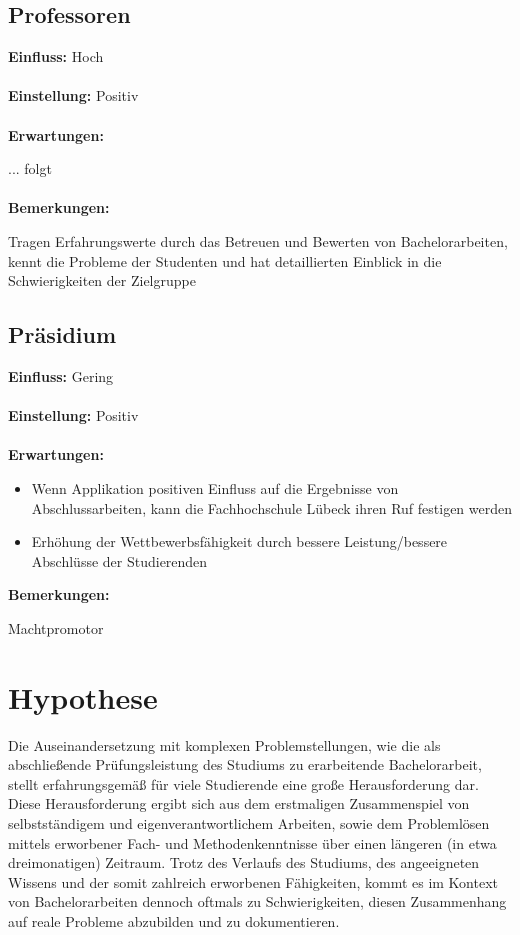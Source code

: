 \documentclass{scrreprt}
\begin{document}
\subsection{Professoren}
\textbf{Einfluss:} Hoch\\\\
\textbf{Einstellung:} Positiv\\\\
\textbf{Erwartungen:}\par ... folgt\\\\
\textbf{Bemerkungen:}\par Tragen Erfahrungswerte durch das Betreuen und Bewerten von Bachelorarbeiten, kennt die Probleme der Studenten und hat detaillierten Einblick in die Schwierigkeiten der Zielgruppe

\subsection{Präsidium}
\textbf{Einfluss:} Gering\\\\
\textbf{Einstellung:} Positiv\\\\
\textbf{Erwartungen:}
\begin{itemize}
\item Wenn Applikation positiven Einfluss auf die Ergebnisse von Abschlussarbeiten, kann die Fachhochschule Lübeck ihren Ruf festigen werden
\item Erhöhung der Wettbewerbsfähigkeit durch bessere Leistung/bessere Abschlüsse der Studierenden
\end{itemize}
\textbf{Bemerkungen:}\par Machtpromotor
\newpage


\section{Hypothese}
\par Die Auseinandersetzung mit komplexen Problemstellungen, wie die als abschließende Prüfungsleistung des Studiums zu erarbeitende Bachelorarbeit, stellt erfahrungsgemäß für viele Studierende eine große Herausforderung dar. Diese Herausforderung ergibt sich aus dem erstmaligen Zusammenspiel von selbstständigem und eigenverantwortlichem Arbeiten, sowie dem Problemlösen mittels erworbener Fach- und Methodenkenntnisse über einen längeren (in etwa dreimonatigen) Zeitraum.
Trotz des Verlaufs des Studiums, des angeeigneten Wissens und der somit zahlreich erworbenen Fähigkeiten, kommt es im Kontext von Bachelorarbeiten dennoch oftmals zu Schwierigkeiten, diesen Zusammenhang auf reale Probleme abzubilden und zu dokumentieren.
\end{document}
